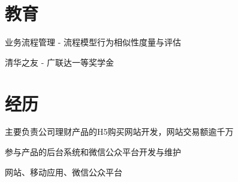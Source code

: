 \documentclass[a4paper]{resume-zh}
\begin{document}
\begin{minipage}[t]{0.72\textwidth} %


\section{教育}

\vspace{\topsep}
\begin{tightitemize}
\item 业务流程管理 - 流程模型行为相似性度量与评估
\item 清华之友 - 广联达一等奖学金
\end{tightitemize}

\sectionspace





\section{经历}

\begin{tightitemize}
\item 主要负责公司理财产品的H5购买网站开发，网站交易额逾千万
\item 参与产品的后台系统和微信公众平台开发与维护
\end{tightitemize}

\sectionspace


\begin{tightitemize}
\item 网站、移动应用、微信公众平台
\end{tightitemize}


\end{minipage}
\end{document}
